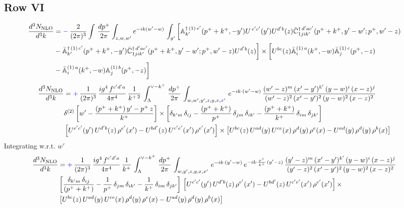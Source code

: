 \documentclass[9pt]{article}
\def\mf#1{\mathbb{#1}}
\numberwithin{equation}{section}
\begin{document}
\subsection{Row VI\,}
\begin{align}
     \frac{d^{3}N_{\rm NLO}}{d^{3}k} & = {\color{blue}-}\,\frac{2}{(2\pi)^{3}} \int\, \frac{dp^{+}}{2\pi}\int_{z,w,w^{\prime}} e^{-ik(w^{\prime}-w)}\, \int_{y^{\prime}}\bigg[\mf{A}^{\dagger\, (1)\,e^{\prime}}_{k^{\prime}}(p^{+}+k^{+},-y^{\prime})U^{\, e^{\prime}c^{\prime}}(y^{\prime})U^{d^{\prime}b}(z) \Bar{\mf{C}}^{\dagger\, d^{\prime}ac^{\prime}}_{1jik^{\prime}}(p^{+}+k^{+},y^{\prime}-w^{\prime}; p^{+},w^{\prime}-z) \notag \\ & -\Bar{\mf{A}}^{\dagger\, (1)\,c^{\prime}}_{k^{\prime}}(p^{+}+k^{+},-y^{\prime})\Bar{\mf{C}}^{\dagger\, d^{\prime}ac^{\prime}}_{1jik^{\prime}}(p^{+}+k^{+},y^{\prime}-w^{\prime}; p^{+},w^{\prime}-z)U^{d^{\prime}b}(z)\bigg] \times \bigg[U^{bc}(z)\Bar{\mf{A}}^{(1)\, a}_{i}(k^{+},- w)\Bar{\mf{A}}^{(1)\, c}_{j}(p^{+},-z)\notag \\ & -\Bar{\mf{A}}^{(1)\, a}_{i}(k^{+},- w) \mf{A}^{(1)\, b}_{j}(p^{+},- z)\bigg]\nonumber
\end{align}
\begin{align}
     \frac{d^{3}N_{\rm NLO}}{d^{3}k} & = {\color{blue}+}\, \frac{1}{(2\pi)^{3}}\,\frac{ig^{4}\,f^{c'd'a}}{4\pi^{4}}\, \frac{1}{k^{+\,2}}\,\int_{\Lambda}^{\vee-k^{+}}\, \frac{dp^{+}}{2\pi}\, \int_{w,w',y',z,y,x,{\color{blue}x'}}\, e^{-ik\cdot (w'-w)}\, \frac{(w'-z)^{m}\,(x'-y')^{k'}\,(y-w)^{i}\,(x-z)^{j}}{(w'-z)^{2}\,(x'-y')^{2}\,(y-w)^{2}\,(x-z)^{2}}\notag \\ & \delta^{(2)}\left[w'-\frac{(p^{+}+k^{+})\,y'-p^{+}\,z}{k^{+}}\right]\times \left[\delta_{k'm}\,\delta_{ij}-\frac{(p^{+}+k^{+})}{p^{+}}\,\delta_{jm}\,\delta_{ik'}-\frac{(p^{+}+k^{+})}{k^{+}}\, \delta_{im}\, \delta_{jk'}\right]\notag \\ & \left[U^{e'c'}(y')\,U^{d'b}(z)\,\rho^{e'}(x')-U^{bd'}(z)\,U^{c'e'}(x')\,\rho^{e'}(x')\right]\times \left[U^{bc}(z)\,U^{ad}(y)\,U^{ce}(x)\,\rho^{d}(y)\,\rho^{e}(x)-U^{ad}(y)\,\rho^{d}(y)\,\rho^{b}(x)\right]
\end{align}
Integrating w.r.t. $w'$
\begin{align}
     \frac{d^{3}N_{\rm NLO}}{d^{3}k} & = {\color{blue}+}\,\frac{1}{(2\pi)^{3}}\, \frac{ig^{4}\,f^{c'd'a}}{4\pi^{4}}\, \frac{1}{k^{+}}\,\int_{\Lambda}^{\vee-k^{+}}\, \frac{dp^{+}}{2\pi}\, \int_{w,y',z,y,x,x'}\, e^{-ik\cdot (y'-w)}\, e^{-ik\cdot \frac{p^{+}}{k^{+}}\,(y'-z)}\,\frac{(y'-z)^{m}\,(x'-y')^{k'}\,(y-w)^{i}\,(x-z)^{j}}{(y'-z)^{2}\,(x'-y')^{2}\,(y-w)^{2}\,(x-z)^{2}}\notag \\ & \left[\frac{\delta_{k'm}\,\delta_{ij}}{(p^{+}+k^{+})}-\frac{1}{p^{+}}\,\delta_{jm}\,\delta_{ik'}-\frac{1}{k^{+}}\, \delta_{im}\, \delta_{jk'}\right]\, \left[U^{e'c'}(y')\,U^{d'b}(z)\,\rho^{e'}(x')-U^{bd'}(z)\,U^{c'e'}(x')\,\rho^{e'}(x')\right]\times\notag \\ &  \left[U^{bc}(z)\,U^{ad}(y)\,U^{ce}(x)\,\rho^{d}(y)\,\rho^{e}(x)-U^{ad}(y)\,\rho^{d}(y)\,\rho^{b}(x)\right]
\end{align}
\end{document}
